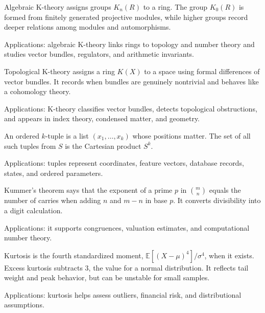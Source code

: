 Algebraic K-theory assigns groups $K_n(R)$ to a ring. The group $K_0(R)$ is formed from finitely generated projective modules, while higher groups record deeper relations among modules and automorphisms. \par\noindent Applications: algebraic K-theory links rings to topology and number theory and studies vector bundles, regulators, and arithmetic invariants.

Topological K-theory assigns a ring $K(X)$ to a space using formal differences of vector bundles. It records when bundles are genuinely nontrivial and behaves like a cohomology theory. \par\noindent Applications: K-theory classifies vector bundles, detects topological obstructions, and appears in index theory, condensed matter, and geometry.

An ordered $k$-tuple is a list $(x_1,\ldots,x_k)$ whose positions matter. The set of all such tuples from $S$ is the Cartesian product $S^k$. \par\noindent Applications: tuples represent coordinates, feature vectors, database records, states, and ordered parameters.

Kummer's theorem says that the exponent of a prime $p$ in $\binom mn$ equals the number of carries when adding $n$ and $m-n$ in base $p$. It converts divisibility into a digit calculation. \par\noindent Applications: it supports congruences, valuation estimates, and computational number theory.

Kurtosis is the fourth standardized moment, $\mathbb E[(X-\mu)^4]/\sigma^4$, when it exists. Excess kurtosis subtracts $3$, the value for a normal distribution. It reflects tail weight and peak behavior, but can be unstable for small samples. \par\noindent Applications: kurtosis helps assess outliers, financial risk, and distributional assumptions.

